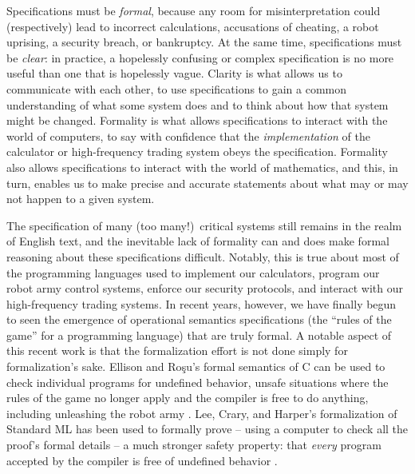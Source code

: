 Specifications must be {\it formal}, because any room for
misinterpretation could (respectively) lead to incorrect calculations,
accusations of cheating, a robot uprising, a security breach, or
bankruptcy. At the same time, specifications must be {\it clear}: in
practice, a hopelessly confusing or complex specification is no more
useful than one that is hopelessly vague. Clarity is what allows us to
communicate with each other, to use specifications to gain a common
understanding of what some system does and to think about how that
system might be changed. Formality is what allows specifications to
interact with the world of computers, to say with confidence that the
{\it implementation} of the calculator or high-frequency trading
system obeys the specification. Formality also allows specifications
to interact with the world of mathematics, and this, in turn, enables
us to make precise and accurate statements about what may or may not
happen to a given system.

The specification of many (too many!)~critical systems still remains
in the realm of English text, and the inevitable lack of formality can
and does make formal reasoning about these specifications difficult.
Notably, this is true about most of the programming languages used to
implement our calculators, program our robot army control systems,
enforce our security protocols, and interact with our high-frequency
trading systems. In recent years, however, we have finally begun to
seen the emergence of operational semantics specifications (the
``rules of the game'' for a programming language) that are truly
formal. A notable aspect of this recent work is that the formalization
effort is not done simply for formalization's sake. Ellison and Ro{\c
  s}u's formal semantics of C can be used to check individual programs
for undefined behavior, unsafe situations where the rules of the game
no longer apply and the compiler is free to do anything, including
unleashing the robot army \cite{ellison12executable}. Lee, Crary, and
Harper's formalization of Standard ML has been used to formally prove
-- using a computer to check all the proof's formal details -- a much
stronger safety property: that {\it every} program accepted by the
compiler is free of undefined behavior \cite{lee07towards}.

